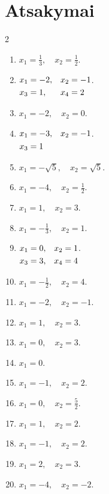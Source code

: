 \documentclass[11pt,a4paper]{article}
\begin{document}
\section*{Atsakymai}
\begingroup\small
\begin{multicols}{2}
\begin{enumerate}
\item \(\displaystyle x_{1}=\frac{1}{3},\quad x_{2}=\frac{1}{2}\).
\item \(\displaystyle \begin{alignedat}[t]{2}x_{1}&=-2,\quad &x_{2}&=-1\\x_{3}&=1,\quad &x_{4}&=2\end{alignedat}\).
\item \(\displaystyle x_{1}=-2,\quad x_{2}=0\).
\item \(\displaystyle \begin{alignedat}[t]{2}x_{1}&=-3,\quad &x_{2}&=-1\\x_{3}&=1\end{alignedat}\).
\item \(\displaystyle x_{1}=-\sqrt{5},\quad x_{2}=\sqrt{5}\).
\item \(\displaystyle x_{1}=-4,\quad x_{2}=\frac{1}{2}\).
\item \(\displaystyle x_{1}=1,\quad x_{2}=3\).
\item \(\displaystyle x_{1}=-\frac{1}{3},\quad x_{2}=1\).
\item \(\displaystyle \begin{alignedat}[t]{2}x_{1}&=0,\quad &x_{2}&=1\\x_{3}&=3,\quad &x_{4}&=4\end{alignedat}\).
\item \(\displaystyle x_{1}=-\frac{1}{2},\quad x_{2}=4\).
\item \(\displaystyle x_{1}=-2,\quad x_{2}=-1\).
\item \(\displaystyle x_{1}=1,\quad x_{2}=3\).
\item \(\displaystyle x_{1}=0,\quad x_{2}=3\).
\item \(\displaystyle x_{1}=0\).
\item \(\displaystyle x_{1}=-1,\quad x_{2}=2\).
\item \(\displaystyle x_{1}=0,\quad x_{2}=\frac{5}{2}\).
\item \(\displaystyle x_{1}=1,\quad x_{2}=2\).
\item \(\displaystyle x_{1}=-1,\quad x_{2}=2\).
\item \(\displaystyle x_{1}=2,\quad x_{2}=3\).
\item \(\displaystyle x_{1}=-4,\quad x_{2}=-2\).

\end{enumerate}
\end{multicols}
\end{document}

